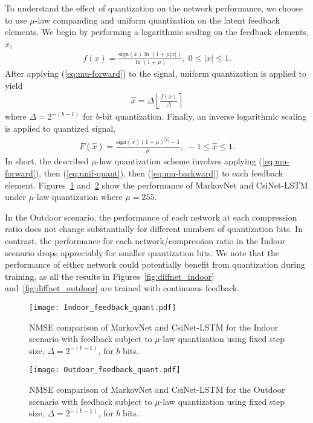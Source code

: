 To understand the effect of quantization on the network performance, we choose to use $\mu$-law companding and uniform quantization on the latent feedback elements. We begin by performing a logarithmic scaling on the feedback elements, $x$,
\begin{align}
	f(x) = \frac{\text{sign}(x)\ln\left(1 + \mu|x|\right)}{\ln\left(1 + \mu\right)} , \; 0 \leq |x| \leq 1. \label{eq:mu-forward}
\end{align}
After applying (\ref{eq:mu-forward}) to the signal, uniform quantization is applied to yield
\begin{align}
	\hat x = \Delta\left\lfloor\frac{f(x)}{\Delta}\right\rceil \label{eq:unif-quant}
\end{align}
where $\Delta = 2^{-(b-1)}$ for $b$-bit quantization. Finally, an inverse logarithmic scaling is applied to quantized signal,
\begin{align}
	F(\hat x) = \frac{\text{sign}(\hat x)\left(1 + \mu\right)^{|\hat x|} - 1}{\mu} , \; -1 \leq \hat x \leq 1. \label{eq:mu-backward}
\end{align}
In short, the described $\mu$-law quantization scheme involves applying (\ref{eq:mu-forward}), then (\ref{eq:unif-quant}), then (\ref{eq:mu-backward}) to each feedback element. Figures~\ref{fig:feedback_quant_indoor} and~\ref{fig:feedback_quant_outdoor} show the performance of MarkovNet and CsiNet-LSTM under $\mu$-law quantization where $\mu=255$.

In the Outdoor scenario, the performance of each network at each compression ratio does not change substantially for different numbers of quantization bits. In contrast, the performance for each network/compression ratio in the Indoor scenario drops appreciably for smaller quantization bits. We note that the performance of either network could potentially benefit from quantization during training, as all the results in Figures~\ref{fig:diffnet_indoor} and~\ref{fig:diffnet_outdoor} are trained with continuous feedback.

\begin{figure}[!hbtp] \centering 
	\texttt{[image: Indoor\_feedback\_quant.pdf]}
    \caption{NMSE comparison of MarkovNet and CsiNet-LSTM for the Indoor scenario with feedback subject to $\mu$-law quantization using fixed step size, $\Delta=2^{-(b-1)}$, for $b$ bits.}
	\label{fig:feedback_quant_indoor} \vspace*{-2mm}
\end{figure}

\begin{figure}[!hbtp] \centering 
	\texttt{[image: Outdoor\_feedback\_quant.pdf]}
    \caption{NMSE comparison of MarkovNet and CsiNet-LSTM for the Outdoor scenario with feedback subject to $\mu$-law quantization using fixed step size, $\Delta=2^{-(b-1)}$, for $b$ bits.}
	\label{fig:feedback_quant_outdoor} \vspace*{-6mm}
\end{figure}